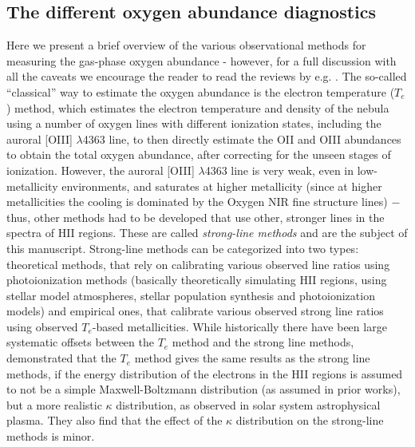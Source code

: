 \documentclass{emulateapj}
\begin{document}
\subsection{The different oxygen abundance diagnostics}
Here we present a brief overview of the various observational methods for measuring the gas-phase oxygen abundance - however, for a full discussion with all the caveats we encourage the reader to read the reviews by e.g. \citet{stasinska02,kewley08,moustakas10,stasinska10,dopita13,blanc15}.
The so-called ``classical'' way to estimate the oxygen abundance is the electron temperature ($T_e$) method, which estimates the electron temperature and density of the nebula using a number of oxygen lines with different ionization states, including the auroral [OIII] $\lambda$4363 line, to then directly estimate the OII and OIII abundances to obtain the total oxygen abundance, after correcting for the unseen stages of ionization. However, the auroral [OIII] $\lambda$4363 line is very weak, even 
in low-metallicity environments, and saturates at higher metallicity (since at higher metallicities the cooling is dominated by the Oxygen NIR fine structure lines) $-$ thus, other methods had to be developed that use other, stronger lines in the spectra of HII regions. These are called \emph{strong-line methods} and are the subject of this manuscript. Strong-line methods can be categorized into two types: theoretical methods, that rely on calibrating various observed line ratios using photoionization methods (basically theoretically simulating HII regions, using stellar model atmospheres, stellar population synthesis and photoionization models) and empirical ones, that calibrate various observed strong line ratios using observed $T_e$-based metallicities. While historically there have been large systematic offsets between the $T_e$ method and the strong line methods, \citet{dopita13} demonstrated that the $T_e$ method gives the same results as the strong line methods, if the energy distribution of the electrons in the HII regions is assumed to not be a simple Maxwell-Boltzmann distribution (as assumed in prior works), but a more realistic $\kappa$ distribution, as observed in solar system astrophysical plasma. They also find that the effect of the $\kappa$ distribution on the strong-line methods is minor.
\end{document}
